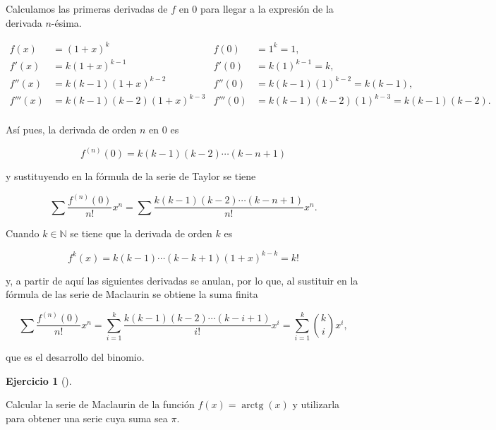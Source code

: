 \documentclass[
  spanish,
  a4paper,
]{scrreport}
\theoremstyle{definition}
\newtheorem{exercise}{Ejercicio}[chapter]
\theoremstyle{remark}
\begin{document}
\begin{tcolorbox}[enhanced jigsaw, arc=.35mm, bottomrule=.15mm, bottomtitle=1mm, breakable, colback=white, colbacktitle=quarto-callout-tip-color!10!white, colframe=quarto-callout-tip-color-frame, coltitle=black, left=2mm, leftrule=.75mm, opacityback=0, opacitybacktitle=0.6, rightrule=.15mm, title=\textcolor{quarto-callout-tip-color}{\faLightbulb}\hspace{0.5em}{Solución}, titlerule=0mm, toprule=.15mm, toptitle=1mm]

Calculamos las primeras derivadas de \(f\) en \(0\) para llegar a la
expresión de la derivada \(n\)-ésima.

\begin{align*}
f(x) &= (1+x)^k & f(0) &= 1^k = 1,\\
f'(x) &= k(1+x)^{k-1} & f'(0) &= k(1)^{k-1} = k,\\
f''(x) &= k(k-1)(1+x)^{k-2} & f''(0) &= k(k-1)(1)^{k-2} = k(k-1),\\
f'''(x) &= k(k-1)(k-2)(1+x)^{k-3} & f'''(0) &= k(k-1)(k-2)(1)^{k-3} = k(k-1)(k-2).\\
\end{align*}

Así pues, la derivada de orden \(n\) en \(0\) es

\[
f^{(n)}(0) = k(k-1)(k-2)\cdots (k-n+1)
\]

y sustituyendo en la fórmula de la serie de Taylor se tiene

\[
\sum \frac{f^{(n)}(0)}{n!}x^n = \sum \frac{k(k-1)(k-2)\cdots (k-n+1)}{n!}x^n.
\]

Cuando \(k\in\mathbb{N}\) se tiene que la derivada de orden \(k\) es

\[
f^{k}(x) = k(k-1)\cdots (k-k+1)(1+x)^{k-k} = k!
\]

y, a partir de aquí las siguientes derivadas se anulan, por lo que, al
sustituir en la fórmula de las serie de Maclaurin se obtiene la suma
finita

\[
\sum \frac{f^{(n)}(0)}{n!}x^n = \sum_{i=1}^k \frac{k(k-1)(k-2)\cdots (k-i+1)}{i!}x^i = \sum_{i=1}^k \binom{k}{i}x^i,
\]

que es el desarrollo del binomio.

\end{tcolorbox}

\begin{exercise}[]\protect\hypertarget{exr-serie-arcotangente}{}\label{exr-serie-arcotangente}

Calcular la serie de Maclaurin de la función
\(f(x)=\operatorname{arctg}(x)\) y utilizarla para obtener una serie
cuya suma sea \(\pi\).

\end{exercise}
\end{document}
